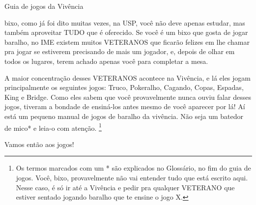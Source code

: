 \begin{secao}{Guia de jogos da Vivência }

bixo, como já foi dito muitas vezes, na USP, você não deve apenas estudar, mas
também aproveitar TUDO que é oferecido. Se você é um bixo que gosta de jogar
baralho, no IME existem muitos VETERANOS que ficarão felizes em lhe chamar pra
jogar se estiverem precisando de mais um jogador, e, depois de olhar em todos
os lugares, terem achado apenas você para completar a mesa. 

A maior concentração desses VETERANOS acontece na Vivência, e lá eles jogam
principalmente os seguintes jogos: Truco, Pokeralho, Cagando, Copas, Espadas,
King e Bridge. Como eles sabem que você provavelmente nunca ouviu falar desses jogos,
tiveram a bondade de ensiná-los antes mesmo de você aparecer por lá! Aí está um
pequeno manual de jogos de baralho da vivência. Não seja um batedor de mico* e
leia-o com atenção. \footnote{Os termos marcados com um * são explicados no Glossário, no fim do guia de
jogos. Você, bixo, provavelmente não vai entender tudo que está escrito aqui.
Nesse caso, é só ir até a Vivência e pedir pra qualquer VETERANO que estiver
sentado jogando baralho que te ensine o jogo X.}

Vamos então aos jogos!










\end{secao}
